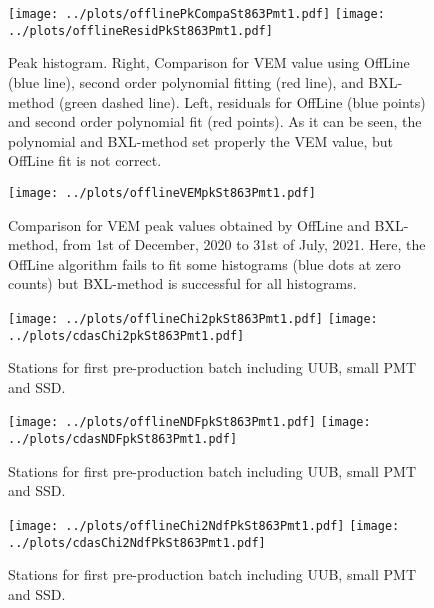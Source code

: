 \documentclass[twoside, final, 10pt]{articleMine}
\begin{document}
\begin{figure}[!tbh]
  \centering
  \subfigure
  {
    \texttt{[image: ../plots/offlinePkCompaSt863Pmt1.pdf]}
    \texttt{[image: ../plots/offlineResidPkSt863Pmt1.pdf]}
  }
  \caption{Peak histogram. Right, Comparison for VEM value using
  OffLine (blue line), second order polynomial fitting (red
  line), and BXL-method (green dashed line). Left, residuals for
  OffLine (blue points) and second order polynomial fit (red
  points). As it can be seen, the polynomial and BXL-method set
  properly the VEM value, but OffLine fit is not correct.}
  \label{figPkCompaOffFitDer}
\end{figure}

\begin{figure}[!tbh]
  \centering
  \subfigure
  {
    \texttt{[image: ../plots/offlineVEMpkSt863Pmt1.pdf]}
  }
  \caption{Comparison for VEM peak values obtained by OffLine and
  BXL-method, from 1st of December, 2020 to 31st of July, 2021.
  Here, the OffLine algorithm fails to fit some histograms (blue
  dots at zero counts) but BXL-method is successful for all
  histograms.}
  \label{figPkCompVemOffBxl}
\end{figure}
\clearpage

\begin{figure}[!tbh]
  \centering
  \subfigure
  {
    \texttt{[image: ../plots/offlineChi2pkSt863Pmt1.pdf]}
    \texttt{[image: ../plots/cdasChi2pkSt863Pmt1.pdf]}
  }
  \caption{Stations for first pre-production batch including UUB, small PMT and SSD.}
  \label{figPkNdfserie}
\end{figure}

\begin{figure}[!tbh]
  \centering
  \subfigure
  {
    \texttt{[image: ../plots/offlineNDFpkSt863Pmt1.pdf]}
    \texttt{[image: ../plots/cdasNDFpkSt863Pmt1.pdf]}
  }
  \caption{Stations for first pre-production batch including UUB, small PMT and SSD.}
  \label{figPkNdfserie}
\end{figure}


\begin{figure}[!tbh]
  \centering
  \subfigure
  {
    \texttt{[image: ../plots/offlineChi2NdfPkSt863Pmt1.pdf]}
    \texttt{[image: ../plots/cdasChi2NdfPkSt863Pmt1.pdf]}
  }
  \caption{Stations for first pre-production batch including UUB, small PMT and SSD.}
  \label{figPkChi2Ndfserie}
\end{figure}
\clearpage
\end{document}

